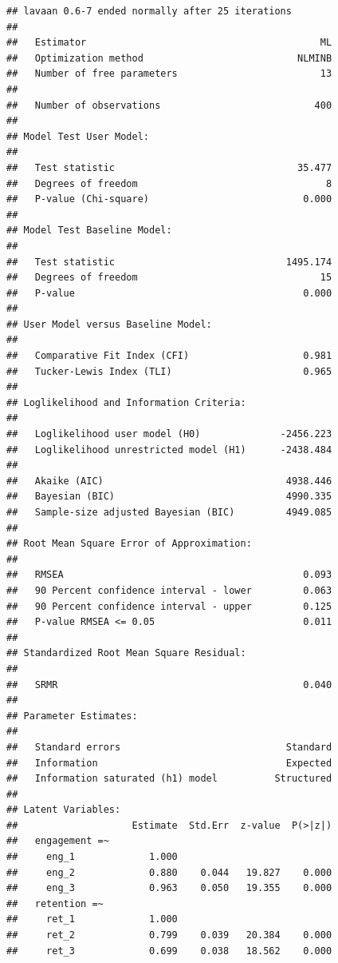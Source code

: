 \documentclass[
]{book}
\begin{document}
\begin{verbatim}
## lavaan 0.6-7 ended normally after 25 iterations
## 
##   Estimator                                         ML
##   Optimization method                           NLMINB
##   Number of free parameters                         13
##                                                       
##   Number of observations                           400
##                                                       
## Model Test User Model:
##                                                       
##   Test statistic                                35.477
##   Degrees of freedom                                 8
##   P-value (Chi-square)                           0.000
## 
## Model Test Baseline Model:
## 
##   Test statistic                              1495.174
##   Degrees of freedom                                15
##   P-value                                        0.000
## 
## User Model versus Baseline Model:
## 
##   Comparative Fit Index (CFI)                    0.981
##   Tucker-Lewis Index (TLI)                       0.965
## 
## Loglikelihood and Information Criteria:
## 
##   Loglikelihood user model (H0)              -2456.223
##   Loglikelihood unrestricted model (H1)      -2438.484
##                                                       
##   Akaike (AIC)                                4938.446
##   Bayesian (BIC)                              4990.335
##   Sample-size adjusted Bayesian (BIC)         4949.085
## 
## Root Mean Square Error of Approximation:
## 
##   RMSEA                                          0.093
##   90 Percent confidence interval - lower         0.063
##   90 Percent confidence interval - upper         0.125
##   P-value RMSEA <= 0.05                          0.011
## 
## Standardized Root Mean Square Residual:
## 
##   SRMR                                           0.040
## 
## Parameter Estimates:
## 
##   Standard errors                             Standard
##   Information                                 Expected
##   Information saturated (h1) model          Structured
## 
## Latent Variables:
##                    Estimate  Std.Err  z-value  P(>|z|)
##   engagement =~                                       
##     eng_1             1.000                           
##     eng_2             0.880    0.044   19.827    0.000
##     eng_3             0.963    0.050   19.355    0.000
##   retention =~                                        
##     ret_1             1.000                           
##     ret_2             0.799    0.039   20.384    0.000
##     ret_3             0.699    0.038   18.562    0.000

\end{verbatim}
\end{document}
